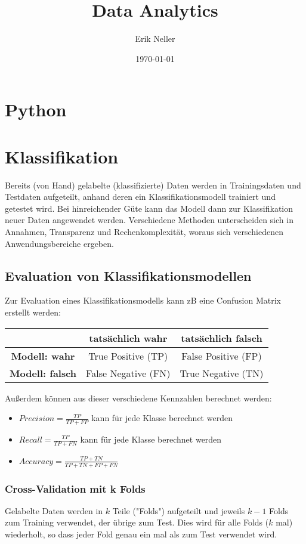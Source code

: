 \documentclass{article}
\title{Data Analytics}
\author{Erik Neller}
\date{\today}
\begin{document}
\maketitle

\section{Python}
\section{Klassifikation}
Bereits (von Hand) gelabelte (klassifizierte) Daten werden in Trainingsdaten und Testdaten aufgeteilt, anhand deren ein Klassifikationsmodell trainiert und getestet wird.
Bei hinreichender Güte kann das Modell dann zur Klassifikation neuer Daten angewendet werden.
Verschiedene Methoden unterscheiden sich in Annahmen, Transparenz und Rechenkomplexität, woraus sich verschiedenen Anwendungsbereiche ergeben.


\subsection{Evaluation von Klassifikationsmodellen}
Zur Evaluation eines Klassifikationsmodells kann zB eine Confusion Matrix erstellt werden:
\begin{center}
\begin{tabular}{|c|c|c|}
    \hline
    & \textbf{tatsächlich wahr} & \textbf{tatsächlich falsch} \\
    \hline
    \textbf{Modell: wahr}& True Positive (TP) & False Positive (FP) \\
    \hline
    \textbf{Modell: falsch} & False Negative (FN) & True Negative (TN) \\
    \hline
\end{tabular}
\end{center}

Außerdem können aus dieser verschiedene Kennzahlen berechnet werden:
\begin{itemize}
    \item $ Precision = \frac{TP}{TP+FP} $ kann für jede Klasse berechnet werden
    \item $ Recall = \frac{TP}{TP+FN} $ kann für jede Klasse berechnet werden
    \item $ Accuracy =  \frac{TP+TN}{TP+TN+FP+FN} $
\end{itemize}

\subsubsection{Cross-Validation mit k Folds}
Gelabelte Daten werden in $k$ Teile ("Folds") aufgeteilt und jeweils $k-1$ Folds zum Training verwendet,
der übrige zum Test. Dies wird für alle Folds ($k$ mal) wiederholt, so dass jeder Fold genau ein mal als zum Test verwendet wird.
\end{document}
